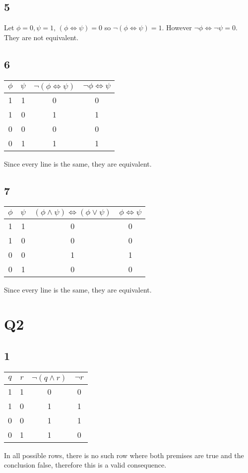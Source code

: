\documentclass[12pt]{article}
\begin{document}
\subsection{5}
Let $\phi = 0, \psi = 1$, $(\phi \iff \psi) = 0$ so $\neg(\phi \iff \psi) = 1$. 
However $\neg\phi \iff \neg \psi = 0$. They are not equivalent.

\subsection{6}
\begin{tabular}{ | c | c | c | c|}
    \hline
    $\phi$ & $\psi$ & $\neg(\phi \iff \psi)$ & $\neg \phi \iff \psi$\\
    \hline
    1 & 1 & 0 & 0 \\
    \hline
    1 & 0 & 1 & 1 \\
    \hline
    0 & 0 & 0 & 0 \\
    \hline
    0 & 1 & 1 & 1 \\
    \hline
\end{tabular}
\newline
Since every line is the same, they are equivalent.

\subsection{7}
\begin{tabular}{ | c | c | c | c|}
    \hline
    $\phi$ & $\psi$ & $(\phi \land \psi) \iff (\phi \lor \psi)$ & $\phi \iff \psi$\\
    \hline
    1 & 1 & 0 & 0 \\
    \hline
    1 & 0 & 0 & 0 \\
    \hline
    0 & 0 & 1 & 1 \\
    \hline
    0 & 1 & 0 & 0 \\
    \hline
\end{tabular}
\newline
Since every line is the same, they are equivalent.


\section{Q2}
\subsection{1}
\begin{tabular}{ | c | c | c | c |}
    \hline
    $q$ & $r$ & $\neg(q \land r)$ & $\neg r$ \\
    \hline
    1 & 1 & 0 & 0 \\
    \hline
    1 & 0 & 1 & 1 \\
    \hline
    0 & 0 & 1 & 1 \\
    \hline
    0 & 1 & 1 & 0 \\
    \hline
\end{tabular}
\newline
In all possible rows, there is no such row where both premises are true and the 
conclusion false, therefore this is a valid consequence.
\end{document}
